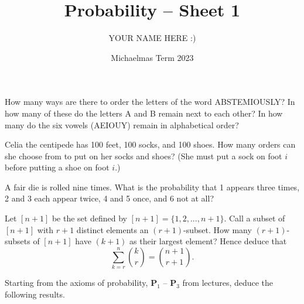 \documentclass[answers]{exam}
\title{Probability -- Sheet 1}
\author{YOUR NAME HERE :)}
\date{Michaelmas Term 2023}
\begin{document}
\maketitle
\begin{questions}

\question%
How many ways are there to order the letters of the word ABSTEMIOUSLY? In how many of these do the letters A and B remain next to each other? In how many do the six vowels (AEIOUY) remain in alphabetical order?



\question%
Celia the centipede has 100 feet, 100 socks, and 100 shoes. How many orders can she choose from to put on her socks and shoes? (She must put a sock on foot $i$ before putting a shoe on foot $i$.)



\question%
A fair die is rolled nine times. What is the probability that 1 appears three times, 2 and 3 each appear twice, 4 and 5 once, and 6 not at all?



\question%
Let $[n+1]$ be the set defined by $[n+1]=\{1,2,...,n+1\}$. Call a subset of $[n+1]$ with $r+1$ distinct elements an $(r+1)$-subset. How many $(r+1)$-subsets of $[n+1]$ have $(k+1)$ as their largest element? Hence deduce that \[
	\sum_{k=r}^n\binom kr=\binom{n+1}{r+1}.
\]



\question%
Starting from the axioms of probability, $\mathbf{P}_1$ -- $\mathbf{P}_3$ from lectures, deduce the following results.




\end{questions}
\end{document}
